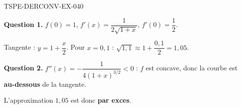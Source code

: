 \begin{corrige}{TSPE-DERCONV-EX-040}

\textbf{Question 1.} $f(0)=1$, $f'(x) = \dfrac{1}{2\sqrt{1+x}}$, $f'(0) = \dfrac{1}{2}$.


Tangente : $y = 1 + \dfrac{x}{2}$. Pour $x = 0{,}1$ : $\sqrt{1{,}1} \approx 1 + \dfrac{0{,}1}{2} = 1{,}05$.

\textbf{Question 2.} $f''(x) = -\dfrac{1}{4(1+x)^{3/2}} < 0$ : $f$ est concave, donc la courbe est \textbf{au-dessous} de la tangente.

L'approximation $1{,}05$ est donc \textbf{par exces}.

\end{corrige}
